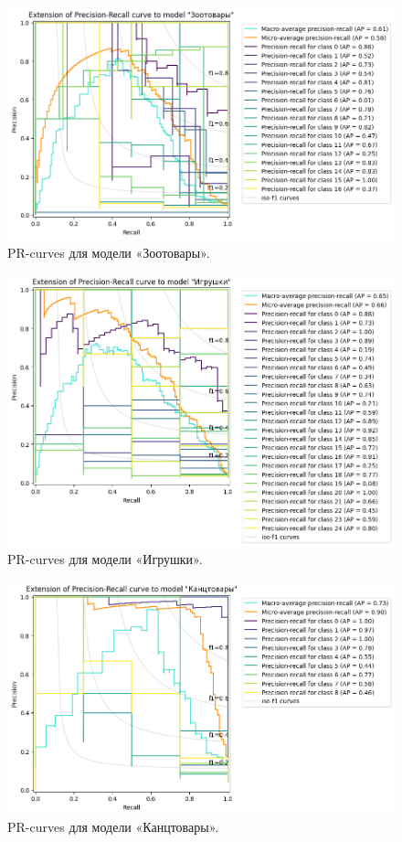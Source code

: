 \documentclass[a4paper,12pt]{extarticle}
\begin{document}
\begin{figure}[hbtp]
	\centering
	\includegraphics[scale=0.7]{pr_curves/prcurve_Зоотовары.png}
	\caption{PR-curves для модели «Зоотовары».}
	\label{fig:prcurve_Зоотовары}
\end{figure}

\begin{figure}[hbtp]
	\centering
	\includegraphics[scale=0.7]{pr_curves/prcurve_Игрушки.png}
	\caption{PR-curves для модели «Игрушки».}
	\label{fig:prcurve_Игрушки}
\end{figure}

\begin{figure}[hbtp]
	\centering
	\includegraphics[scale=0.7]{pr_curves/prcurve_Канцтовары.png}
	\caption{PR-curves для модели «Канцтовары».}
	\label{fig:prcurve_Канцтовары}
\end{figure}
\end{document}
